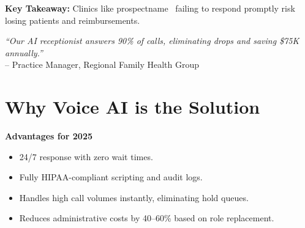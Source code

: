 \documentclass[10pt]{article}
\newcommand{\prospectname}{{ prospectname }}
\begin{document}
\textbf{Key Takeaway:} Clinics like \prospectname\ failing to respond promptly risk losing patients and reimbursements.

\vspace{0.8cm}
\begin{flushright}
    \textit{``Our AI receptionist answers 90\% of calls, eliminating drops and saving \$75K annually.''} \\
    -- Practice Manager, Regional Family Health Group
\end{flushright}

\vspace{1cm}

\section*{Why Voice AI is the Solution}
\textbf{Advantages for 2025}
\begin{itemize}
    \item 24/7 response with zero wait times.
    \item Fully HIPAA-compliant scripting and audit logs.
    \item Handles high call volumes instantly, eliminating hold queues.
    \item Reduces administrative costs by 40--60\% based on role replacement.
\end{itemize}
\end{document}

